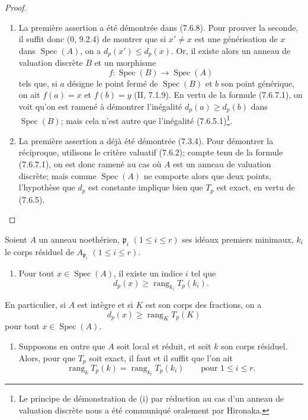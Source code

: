 \begin{proof}
\begin{enumerate}
  \item[(i)] La première assertion a été démontrée dans (7.6.8). Pour prouver
    la seconde, il suffit donc ($0$, 9.2.4) de montrer que si $x'\ne x$ est une
    générisation de $x$ dans $\operatorname{Spec}(A)$, on a
    $d_p(x')\leq d_p(x)$. Or, il existe alors un anneau de valuation discrète
    $B$ et un morphisme
    \[
      f:\operatorname{Spec}(B)\longrightarrow\operatorname{Spec}(A)
    \]
    tels que, si $a$ désigne le point fermé de $\operatorname{Spec}(B)$ et $b$
    son point générique, on ait $f(a)=x$ et $f(b)=y$ (II, 7.1.9). En vertu de
    la formule (7.6.7.1), on voit qu'on est ramené à démontrer l'inégalité
    $d_p(a)\geq d_p(b)$ dans $\operatorname{Spec}(B)$; mais cela n'est autre que
    l'inégalité (7.6.5.1)\footnote{Le principe de démonstration de (i) par
    réduction au cas d'un anneau de valuation discrète nous a été communiqué
    oralement par Hironaka.}.
  \item[(ii)] La première assertion a déjà été démontrée (7.3.4). Pour démontrer
    la réciproque, utilisons le critère valuatif (7.6.2); compte tenu de la
    formule (7.6.7.1), on est donc ramené au cas où $A$ est un anneau de
    valuation discrète; mais comme $\operatorname{Spec}(A)$ ne comporte alors
    que deux points, l'hypothèse que $d_p$ est constante implique bien que $T_p$
    est exact, en vertu de (7.6.5).
\end{enumerate}
\end{proof}

\begin{corollary}[7.6.10]
Soient $A$ un anneau noethérien, $\mathfrak p_i$ $(1\leq i\leq r)$ ses idéaux
premiers minimaux, $k_i$ le corps résiduel de $A_{\mathfrak p_i}$
$(1\leq i\leq r)$.
\begin{enumerate}
  \item[(i)] Pour tout $x\in\operatorname{Spec}(A)$, il existe un indice $i$
    tel que
    \[
      d_p(x)\geq\operatorname{rang}_{k_i}T_p(k_i).
      \tag{7.6.10.1}\label{III.7.6.10.1.fr}
    \]
\end{enumerate}
En particulier, si $A$ est intègre et si $K$ est son corps des fractions, on a
\[
  d_p(x)\geq\operatorname{rang}_K T_p(K)
  \tag{7.6.10.2}\label{III.7.6.10.2.fr}
\]
pour tout $x\in\operatorname{Spec}(A)$.
\begin{enumerate}
  \item[(ii)] Supposons en outre que $A$ soit local et réduit, et soit $k$ son
    corps résiduel. Alors, pour que $T_p$ soit exact, il faut et il suffit que
    l'on ait
    \[
      \operatorname{rang}_k T_p(k)
      =
      \operatorname{rang}_{k_i}T_p(k_i)
      \qquad\text{pour }1\leq i\leq r.
      \tag{7.6.10.3}\label{III.7.6.10.3.fr}
    \]
\end{enumerate}
\end{corollary}

